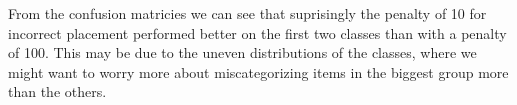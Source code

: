 \documentclass[11pt]{article}
\begin{document}
From the confusion matricies we can see that suprisingly the penalty of 10 for incorrect placement performed better on the 
first two classes than with a penalty of 100.
This may be due to the uneven distributions of the classes, where we might want to worry more about miscategorizing items
in the biggest group more than the others.
\end{document}
